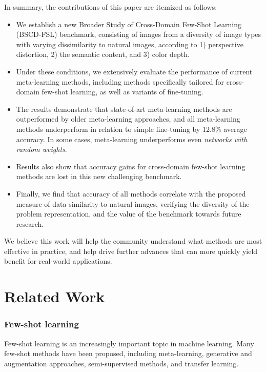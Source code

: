 \documentclass[runningheads]{llncs}
\begin{document}
In summary, the contributions of this paper are itemized as follows:

\begin{itemize}
\item We establish a new Broader Study of Cross-Domain Few-Shot Learning (BSCD-FSL) benchmark, consisting of images from a diversity of image types with varying dissimilarity to natural images, according to 1) perspective distortion, 2) the semantic content, and 3) color depth. 
\item Under these conditions, we extensively evaluate the performance of current meta-learning methods, including methods specifically tailored for cross-domain few-shot learning, as well as variants of fine-tuning.
    
\item The results demonstrate that  state-of-art meta-learning methods are outperformed by older meta-learning approaches, and all meta-learning methods underperform in relation to simple fine-tuning by 12.8\% average accuracy. In some cases, meta-learning underperforms even {\em networks with random weights}. 

\item Results also show that accuracy gains for cross-domain few-shot learning methods are lost in this new challenging benchmark. 

\item Finally, we find that accuracy of all methods correlate with the proposed measure of data similarity to natural images, verifying the diversity of the problem representation, and the value of the benchmark towards future research.

\end{itemize}

We believe this work will help the community understand what methods are most effective in practice, and help drive further advances that can more quickly yield benefit for real-world applications.

\section{Related Work}
\subsubsection{Few-shot learning}
Few-shot learning \cite{lake2015human,vinyals2016matching,lake2011one} is an increasingly important topic in machine learning. Many few-shot methods have been proposed, including meta-learning, generative and augmentation approaches, semi-supervised methods, and transfer learning. 
\end{document}
